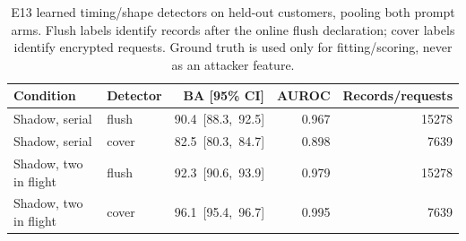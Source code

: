 \begin{table}[htbp]\centering\footnotesize
\caption{E13 learned timing/shape detectors on held-out customers, pooling both prompt arms. Flush labels identify records after the online flush declaration; cover labels identify encrypted requests. Ground truth is used only for fitting/scoring, never as an attacker feature.}
\begin{tabular}{llrrr}\toprule
Condition & Detector & BA [95\% CI] & AUROC & Records/requests\\\midrule
Shadow, serial & flush & \mbox{90.4 [88.3, 92.5]} & 0.967 & 15278 \\
Shadow, serial & cover & \mbox{82.5 [80.3, 84.7]} & 0.898 & 7639 \\
Shadow, two in flight & flush & \mbox{92.3 [90.6, 93.9]} & 0.979 & 15278 \\
Shadow, two in flight & cover & \mbox{96.1 [95.4, 96.7]} & 0.995 & 7639 \\
\bottomrule\end{tabular}
\end{table}
